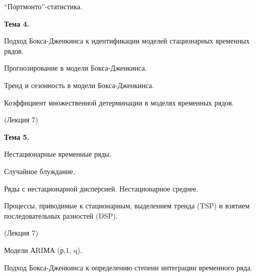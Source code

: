 \documentclass[a4paper,8pt]{article} %
\begin{document}
``Портмонто''-статистика. 



\textbf{Тема 4.}

Подход  Бокса-Дженкинса  к  идентификации  моделей  стационарных временных рядов.

Прогнозирование  в  модели  Бокса-Дженкинса.  

Тренд  и  сезонность  в  модели  Бокса-Дженкинса. 

Коэффициент множественной детерминации в моделях временных рядов.

(Лекция 7)

\textbf{Тема 5.}

Нестационарные  временные  ряды.  

Случайное  блуждание.  

Ряды  с  нестационарной дисперсией.  Нестационарное  среднее.  

Процессы,  приводимые  к  стационарным,  выделением тренда  (TSP)  и  взятием  последовательных  разностей  (DSP). 

(Лекция 7)


Модели  АRIМА  (р,1, q).  

Подход Бокса-Дженкинса к определению степени интеграции временного ряда.





	
\end{document}
